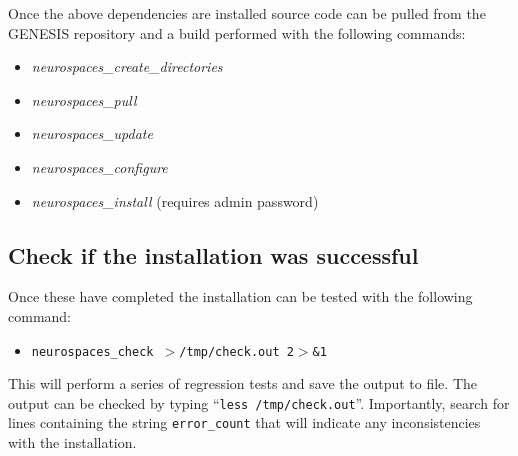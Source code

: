 \documentclass[12pt]{article}
\begin{document}
Once the above dependencies are installed source code can be pulled from the GENESIS repository and a build performed with the following commands:
\begin{itemize}
   \item[]{\it neurospaces\_create\_directories}
   \item[]{\it neurospaces\_pull}
   \item[]{\it neurospaces\_update}
   \item[]{\it neurospaces\_configure}
   \item[]{\it neurospaces\_install} (requires admin password) 
\end{itemize}

\subsection*{Check if the installation was successful}

Once these have completed the installation can be tested with the following command:
\begin{itemize}
   \item[]{\tt neurospaces\_check $>$/tmp/check.out 2$>$\&1}
\end{itemize}
This will perform a series of regression tests and save the output to file. The output can be checked by typing ``{\tt less /tmp/check.out}''. Importantly, search for lines containing the string {\tt error\_count} that will indicate any inconsistencies with the installation.
\end{document}
